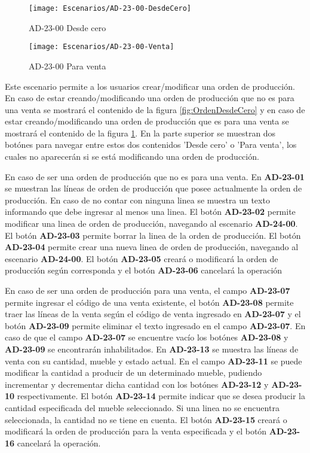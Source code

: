 \begin{figure}[H]
    \centering
    \begin{minipage}[b]{0.4\textwidth}
        \texttt{[image: Escenarios/AD-23-00-DesdeCero]}
        \caption{AD-23-00 Desde cero}
        \label{fig:OrdenDesdeCero}
    \end{minipage}
    \hfill
    \begin{minipage}[b]{0.4\textwidth}
        \texttt{[image: Escenarios/AD-23-00-Venta]}
        \caption{AD-23-00 Para venta}
        \label{fig:OrdenParaVenta}
    \end{minipage}
    \end{figure}

Este escenario permite a los usuarios crear/modificar una orden de producción. En caso de estar creando/modificando una orden de producción que no es para una venta se mostrará el contenido de la figura \ref{fig:OrdenDesdeCero} y en caso de estar creando/modificando una orden de producción que es para una venta se mostrará el contenido de la figura \ref{fig:OrdenParaVenta}. En la parte superior se muestran dos botónes para navegar entre estos dos contenidos 'Desde cero' o 'Para venta', los cuales no aparecerán si se está modificando una orden de producción. 

En caso de ser una orden de producción que no es para una venta. En \textbf{AD-23-01} se muestran las líneas de orden de producción que posee actualmente la orden de producción. En caso de no contar con ninguna linea se muestra un texto informando que debe ingresar al menos una linea. El botón \textbf{AD-23-02} permite modificar una linea de orden de producción, navegando al escenario \textbf{AD-24-00}. El botón \textbf{AD-23-03} permite borrar la linea de la orden de producción. El botón \textbf{AD-23-04} permite crear una nueva linea de orden de producción, navegando al escenario \textbf{AD-24-00}. El botón \textbf{AD-23-05} creará o modificará la orden de producción según corresponda y el botón \textbf{AD-23-06} cancelará la operación

En caso de ser una orden de producción para una venta, el campo \textbf{AD-23-07} permite ingresar el código de una venta existente, el botón \textbf{AD-23-08} permite traer las líneas de la venta según el código de venta ingresado en \textbf{AD-23-07} y el botón \textbf{AD-23-09} permite eliminar el texto ingresado en el campo \textbf{AD-23-07}. En caso de que el campo \textbf{AD-23-07} se encuentre vacío los botónes \textbf{AD-23-08} y \textbf{AD-23-09} se encontrarán inhabilitados. 
En \textbf{AD-23-13} se muestra las líneas de venta con su cantidad, mueble y estado actual. En el campo \textbf{AD-23-11} se puede modificar la cantidad a producir de un determinado mueble, pudiendo incrementar y decrementar dicha cantidad con los botónes \textbf{AD-23-12} y \textbf{AD-23-10} respectivamente. El botón \textbf{AD-23-14} permite indicar que se desea producir la cantidad especificada del mueble seleccionado. Si una linea no se encuentra seleccionada, la cantidad no se tiene en cuenta.
El botón \textbf{AD-23-15} creará o modificará la orden de producción para la venta especificada y el botón \textbf{AD-23-16} cancelará la operación.
\clearpage
